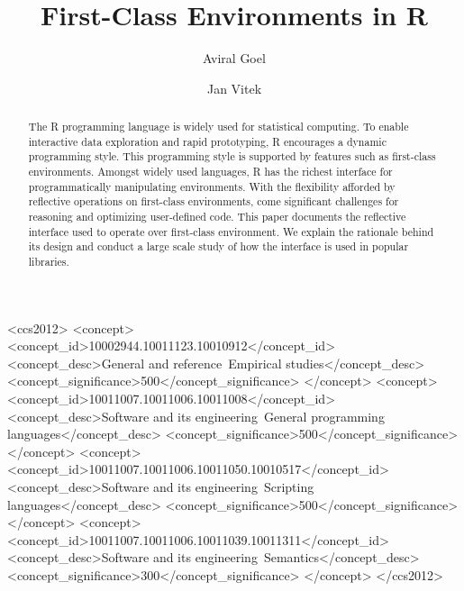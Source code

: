 \documentclass[10pt,sigplan,authorversion=true]{acmart}
\begin{document}
\title{First-Class Environments in R}
\author{Aviral Goel}
\author{Jan Vitek}
\authorsaddresses{}
\renewcommand{\shortauthors}{Goel, Vitek}


\begin{abstract}
  The R programming language is widely used for statistical computing. To enable
  interactive data exploration and rapid prototyping, R encourages a dynamic
  programming style. This programming style is supported by features such as
  first-class environments. Amongst widely used languages, R has the richest
  interface for programmatically manipulating environments. With the flexibility
  afforded by reflective operations on first-class environments, come
  significant challenges for reasoning and optimizing user-defined code. This
  paper documents the reflective interface used to operate over first-class
  environment. We explain the rationale behind its design and conduct a large
  scale study of how the interface is used in popular libraries.
\end{abstract}

\begin{CCSXML}
<ccs2012>
<concept>
<concept_id>10002944.10011123.10010912</concept_id>
<concept_desc>General and reference~Empirical studies</concept_desc>
<concept_significance>500</concept_significance>
</concept>
<concept>
<concept_id>10011007.10011006.10011008</concept_id>
<concept_desc>Software and its engineering~General programming languages</concept_desc>
<concept_significance>500</concept_significance>
</concept>
<concept>
<concept_id>10011007.10011006.10011050.10010517</concept_id>
<concept_desc>Software and its engineering~Scripting languages</concept_desc>
<concept_significance>500</concept_significance>
</concept>
<concept>
<concept_id>10011007.10011006.10011039.10011311</concept_id>
<concept_desc>Software and its engineering~Semantics</concept_desc>
<concept_significance>300</concept_significance>
</concept>
</ccs2012>
\end{CCSXML}


\end{document}
